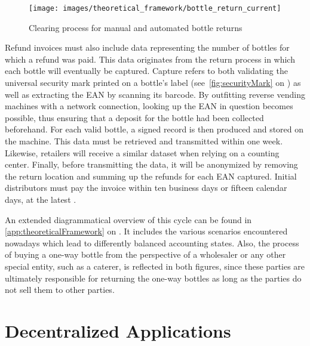 \begin{figure}[hbt]
	\centering
  	\texttt{[image: images/theoretical\_framework/bottle\_return\_current]}
  	\caption[Clearing process for manual and automated bottle returns]{Clearing process for manual and automated bottle returns \cite[p.~18]{Hartlep2011Recycling}}
  	\label{fig:clearingProcess}
\end{figure}

Refund invoices must also include data representing the number of bottles for which a refund was paid. This data originates from the return process in which each bottle will eventually be captured. Capture refers to both validating the universal security mark printed on a bottle’s label (see~\autoref{fig:securityMark} on ) as well as extracting the \ac{EAN} by scanning its barcode. By outfitting reverse vending machines with a network connection, looking up the \ac{EAN} in question becomes possible, thus ensuring that a deposit for the bottle had been collected beforehand. For each valid bottle, a signed record is then produced and stored on the machine. This data must be retrieved and transmitted within one week. Likewise, retailers will receive a similar dataset when relying on a counting center. Finally, before transmitting the data, it will be anonymized by removing the return location and summing up the refunds for each \ac{EAN} captured. Initial distributors must pay the invoice within ten business days or fifteen calendar days, at the latest  \cite[p.~18-19]{Hartlep2011Recycling}.

An extended diagrammatical overview of this cycle can be found in \autoref{app:theoreticalFramework} on . It includes the various scenarios encountered nowadays which lead to differently balanced accounting states. Also, the process of buying a one-way bottle from the perspective of a wholesaler or any other special entity, such as a caterer, is reflected in both figures, since these parties are ultimately responsible for returning the one-way bottles as long as the parties do not sell them to other parties.

\pagebreak

\section{Decentralized Applications}

